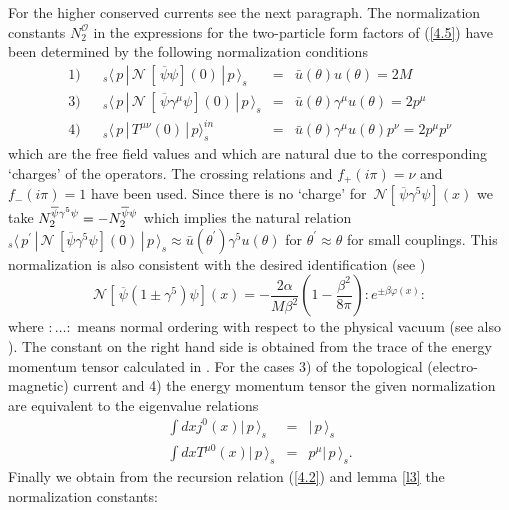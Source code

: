 \documentclass[a4paper,a4paper]{article}
\begin{document}
For the higher conserved currents see the next paragraph. The normalization
constants $N_{2}^{\mathcal{O}}$ in the expressions for the two-particle form
factors of (\ref{4.5}) have been determined by the following normalization
conditions 
\[
\begin{array}{llrcl}
1) &  & _{s}\langle \,p\,|\,\mathcal{N\,}\left[ \,\overline{\psi }\psi
\right] (0)\,|\,p\,\rangle _{s} & = & \bar{u}(\theta )u(\theta )=2M \\[2mm] 
3) &  & _{s}\langle \,p\,|\,\mathcal{N\,}\left[ \,\overline{\psi }\gamma
^{\mu }\psi \right] (0)\,|\,p\,\rangle _{s} & = & \bar{u}(\theta )\gamma
^{\mu }u(\theta )=2p^{\mu } \\[2mm] 
4) &  & _{s}\langle \,p\,|\,T^{\mu \nu }(0)\,|\,p\rangle _{s}^{in} & = & 
\bar{u}(\theta )\gamma ^{\mu }u(\theta )p^{\nu }=2p^{\mu }p^{\nu }
\end{array}
\]
which are the free field values and which are natural due to the
corresponding `charges' of the operators. The crossing relations and $%
f_{+}(i\pi )=\nu $ and $f_{-}(i\pi )=1$ have been used. Since there is no
`charge' for $\,\mathcal{N}\left[ \,\overline{\psi }\gamma ^{5}\psi \right]
(x)$ we take $N_{2}^{\overline{\psi }\gamma ^{5}\psi }=-N_{2}^{\overline{%
\psi }\psi }$ which implies the natural relation $_{s}\langle \,p^{\prime
}\,|\,\mathcal{N\,}\left[ \overline{\psi }\gamma ^{5}\psi \right]
(0)\,|\,p\,\rangle _{s}\approx \bar{u}(\theta ^{\prime })\gamma ^{5}u(\theta
)$ for $\theta ^{\prime }\approx \theta $ for small couplings. This
normalization is also consistent with the desired identification (see \cite
{Co}) 
\[
\mathcal{N}\left[ \,\overline{\psi }\left( 1\pm \gamma ^{5}\right) \psi
\right] (x)=-\frac{2\alpha }{M\beta ^{2}}\left( 1-\frac{\beta ^{2}}{8\pi }%
\right) :e^{\pm \beta \varphi (x)}: 
\]
where $:\dots :$ means normal ordering with respect to the physical vacuum
(see also \cite{BK1,BK}). The constant on the right hand side is obtained
from the trace of the energy momentum tensor calculated in \cite{BK1,BK}.
For the cases 3) of the topological (electro-magnetic) current and 4) the
energy momentum tensor the given normalization are equivalent to the
eigenvalue relations 
\begin{eqnarray*}
\int dxj^{0}(x)|\,p\,\rangle _{s} &=&|\,p\,\rangle _{s} \\
\int dxT^{\mu 0}(x)|\,p\,\rangle _{s} &=&p^{\mu }|\,p\,\rangle _{s}.
\end{eqnarray*}
Finally we obtain from the recursion relation (\ref{4.2}) and lemma \ref{l3}
the normalization constants: 
\end{document}
